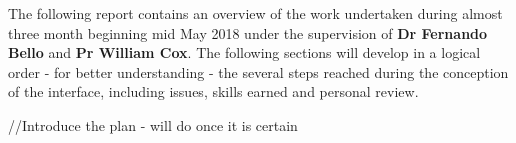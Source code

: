 \newline \vspace{5mm}
The following report contains an overview of the work undertaken during almost three month beginning mid May 2018 under the supervision of \textbf{Dr Fernando Bello} and \textbf{Pr William Cox}. The following sections will develop in a logical order - for better understanding - the several steps reached during the conception of the interface, including issues, skills earned and personal review. 

\newline \vspace{5mm}
//Introduce the plan - will do once it is certain

  


 





